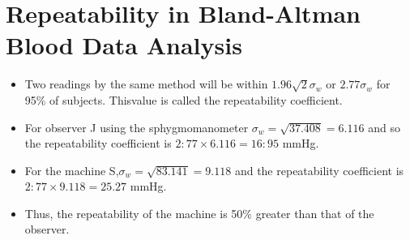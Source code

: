 \documentclass[12pt, a4paper]{article}
\begin{document}
\section{Repeatability in Bland-Altman Blood Data Analysis}
\begin{itemize}
	\item Two readings by the same method will be within $1.96
	\sqrt{2} \sigma_w $ or $2.77 \sigma_w $ for 95\% of subjects. Thisvalue is called the repeatability coefficient.
	
	\item For observer J using the sphygmomanometer $ \sigma_w = \sqrt{37.408} = 6.116$ and so the repeatability coefficient is
	$2:77 \times 6.116 = 16:95$ mmHg.
	
	\item For the machine S,$ \sigma_w = \sqrt{83.141} = 9.118$ and the repeatability coefficient is $2:77 \times 9.118 = 25.27$ mmHg.
	
	\item Thus, the repeatability of the machine is 50\% greater than that of the observer.
\end{itemize}
\end{document}
